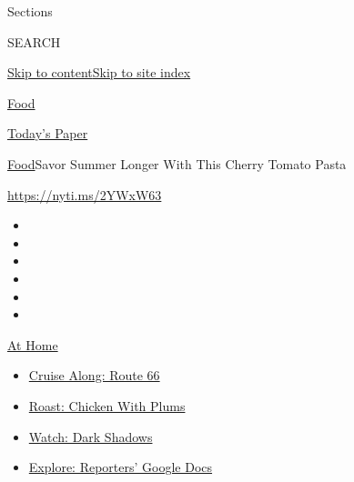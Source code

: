 Sections

SEARCH

\protect\hyperlink{site-content}{Skip to
content}\protect\hyperlink{site-index}{Skip to site index}

\href{https://www.nytimes3xbfgragh.onion/section/food}{Food}

\href{https://myaccount.nytimes3xbfgragh.onion/auth/login?response_type=cookie\&client_id=vi}{}

\href{https://www.nytimes3xbfgragh.onion/section/todayspaper}{Today's
Paper}

\href{/section/food}{Food}\textbar{}Savor Summer Longer With This Cherry
Tomato Pasta

\url{https://nyti.ms/2YWxW63}

\begin{itemize}
\item
\item
\item
\item
\item
\item
\end{itemize}

\href{https://www.nytimes3xbfgragh.onion/spotlight/at-home?action=click\&pgtype=Article\&state=default\&region=TOP_BANNER\&context=at_home_menu}{At
Home}

\begin{itemize}
\tightlist
\item
  \href{https://www.nytimes3xbfgragh.onion/2020/09/07/travel/route-66.html?action=click\&pgtype=Article\&state=default\&region=TOP_BANNER\&context=at_home_menu}{Cruise
  Along: Route 66}
\item
  \href{https://www.nytimes3xbfgragh.onion/2020/09/04/dining/sheet-pan-chicken.html?action=click\&pgtype=Article\&state=default\&region=TOP_BANNER\&context=at_home_menu}{Roast:
  Chicken With Plums}
\item
  \href{https://www.nytimes3xbfgragh.onion/2020/09/04/arts/television/dark-shadows-stream.html?action=click\&pgtype=Article\&state=default\&region=TOP_BANNER\&context=at_home_menu}{Watch:
  Dark Shadows}
\item
  \href{https://www.nytimes3xbfgragh.onion/interactive/2020/at-home/even-more-reporters-editors-diaries-lists-recommendations.html?action=click\&pgtype=Article\&state=default\&region=TOP_BANNER\&context=at_home_menu}{Explore:
  Reporters' Google Docs}
\end{itemize}


